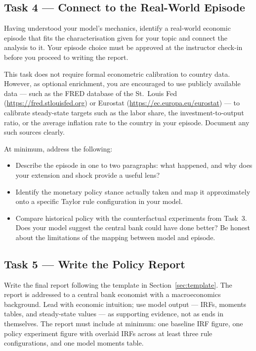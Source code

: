 \documentclass[11pt, a4paper]{article}
\begin{document}
\subsection{Task 4 --- Connect to the Real-World Episode}

Having understood your model's mechanics, identify a real-world economic episode
that fits the characterisation given for your topic and connect the analysis to
it. Your episode choice must be approved at the instructor check-in before you
proceed to writing the report.

This task does not require formal econometric calibration to country data.
However, as optional enrichment, you are encouraged to use publicly available
data --- such as the FRED database of the St.\ Louis Fed
(\url{https://fred.stlouisfed.org}) or Eurostat
(\url{https://ec.europa.eu/eurostat}) --- to calibrate steady-state targets
such as the labor share, the investment-to-output ratio, or the average
inflation rate to the country in your episode. Document any such sources
clearly.

At minimum, address the following:

\begin{itemize}[noitemsep]
    \item Describe the episode in one to two paragraphs: what happened, and why
          does your extension and shock provide a useful lens?
    \item Identify the monetary policy stance actually taken and map it
          approximately onto a specific Taylor rule configuration in your model.
    \item Compare historical policy with the counterfactual experiments from
          Task~3. Does your model suggest the central bank could have done
          better? Be honest about the limitations of the mapping between model
          and episode.
\end{itemize}

\subsection{Task 5 --- Write the Policy Report}

Write the final report following the template in Section~\ref{sec:template}.
The report is addressed to a central bank economist with a macroeconomics
background. Lead with economic intuition; use model output --- IRFs, moments
tables, and steady-state values --- as supporting evidence, not as ends in
themselves. The report must include at minimum: one baseline IRF figure, one
policy experiment figure with overlaid IRFs across at least three rule
configurations, and one model moments table.
\end{document}
